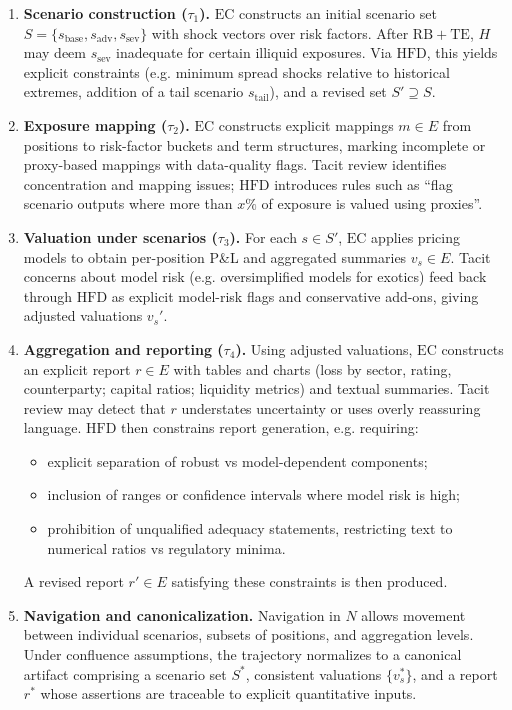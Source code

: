 \begin{enumerate}
  \item \textbf{Scenario construction (\(\tau_1\)).}
  \(\mathrm{EC}\) constructs an initial scenario set \(S = \{s_{\mathrm{base}}, s_{\mathrm{adv}}, s_{\mathrm{sev}}\}\) with shock vectors over risk factors. After \(\mathrm{RB}+\mathrm{TE}\), \(H\) may deem \(s_{\mathrm{sev}}\) inadequate for certain illiquid exposures. Via \(\mathrm{HFD}\), this yields explicit constraints (e.g. minimum spread shocks relative to historical extremes, addition of a tail scenario \(s_{\mathrm{tail}}\)), and a revised set \(S' \supseteq S\).
  \item \textbf{Exposure mapping (\(\tau_2\)).}
  \(\mathrm{EC}\) constructs explicit mappings \(m \in E\) from positions to risk-factor buckets and term structures, marking incomplete or proxy-based mappings with data-quality flags. Tacit review identifies concentration and mapping issues; \(\mathrm{HFD}\) introduces rules such as ``flag scenario outputs where more than \(x\%\) of exposure is valued using proxies''.
  \item \textbf{Valuation under scenarios (\(\tau_3\)).}
  For each \(s \in S'\), \(\mathrm{EC}\) applies pricing models to obtain per-position P\&L and aggregated summaries \(v_s \in E\). Tacit concerns about model risk (e.g. oversimplified models for exotics) feed back through \(\mathrm{HFD}\) as explicit model-risk flags and conservative add-ons, giving adjusted valuations \(v_s'\).
  \item \textbf{Aggregation and reporting (\(\tau_4\)).}
  Using adjusted valuations, \(\mathrm{EC}\) constructs an explicit report \(r \in E\) with tables and charts (loss by sector, rating, counterparty; capital ratios; liquidity metrics) and textual summaries. Tacit review may detect that \(r\) understates uncertainty or uses overly reassuring language. \(\mathrm{HFD}\) then constrains report generation, e.g. requiring:
  \begin{itemize}
    \item explicit separation of robust vs model-dependent components;
    \item inclusion of ranges or confidence intervals where model risk is high;
    \item prohibition of unqualified adequacy statements, restricting text to numerical ratios vs regulatory minima.
  \end{itemize}
  A revised report \(r' \in E\) satisfying these constraints is then produced.
  \item \textbf{Navigation and canonicalization.}
  Navigation in \(N\) allows movement between individual scenarios, subsets of positions, and aggregation levels. Under confluence assumptions, the trajectory normalizes to a canonical artifact comprising a scenario set \(S^\ast\), consistent valuations \(\{v_s^\ast\}\), and a report \(r^\ast\) whose assertions are traceable to explicit quantitative inputs.
\end{enumerate}

